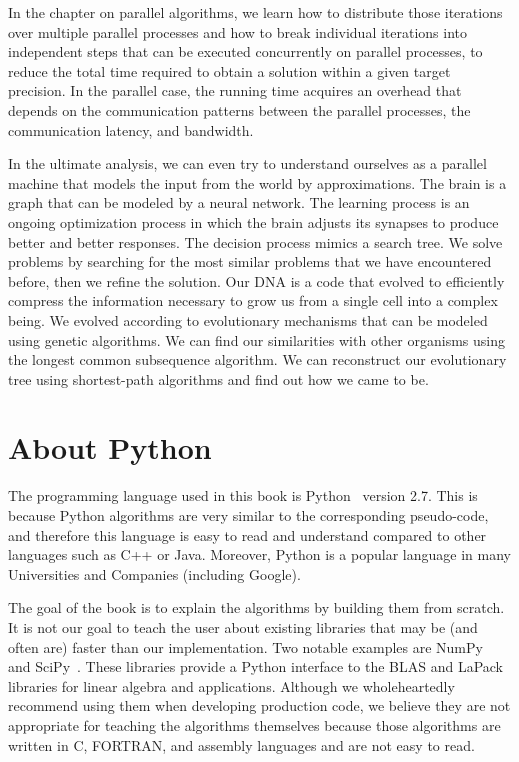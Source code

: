 \documentclass[justified,sixbynine]{tufte-book}
\theoremstyle{plain}%
\theoremstyle{definition}
\theoremstyle{remark}
\begin{document}
\begin{fullwidth}
In the chapter on parallel algorithms, we learn how to distribute those iterations over multiple parallel processes and how to break individual iterations into independent steps that can be executed concurrently on parallel processes, to reduce the total time required to obtain a solution within a given target precision. In the parallel case, the running time acquires an overhead that depends on the communication patterns between the parallel processes, the communication latency, and bandwidth.

In the ultimate analysis, we can even try to understand ourselves as a parallel machine that models the input from the world by approximations. The brain is a graph that can be modeled by a neural network. The learning process is an ongoing optimization process in which the brain adjusts its synapses to produce better and better responses. The decision process mimics a search tree. We solve problems by searching for the most similar problems that we have encountered before, then we refine the solution. Our DNA is a code that evolved to efficiently compress the information necessary to grow us from a single cell into a complex being. We evolved according to evolutionary mechanisms that can be modeled using genetic algorithms. We can find our similarities with other organisms using the longest common subsequence algorithm. We can reconstruct our evolutionary tree using shortest-path algorithms and find out how we came to be.

\section{About Python}

The programming language used in this book is Python~\cite{python} version 2.7. This is because Python algorithms are very similar to the corresponding pseudo-code, and therefore this language is easy to read and understand compared to other languages such as C++ or Java. Moreover, Python is a popular language in many Universities and Companies (including Google).

The goal of the book is to explain the algorithms by building them from scratch. It is not our goal to teach the user about existing libraries that may be (and often are) faster than our implementation. Two notable examples are NumPy~\cite{numpy} and SciPy~\cite{scipy}. These libraries provide a Python interface to the BLAS and LaPack libraries for linear algebra and applications. Although we wholeheartedly recommend using them when developing production code, we believe they are not appropriate for teaching the algorithms themselves because those algorithms are written in C, FORTRAN, and assembly languages and are not easy to read.


\end{fullwidth}
\end{document}
